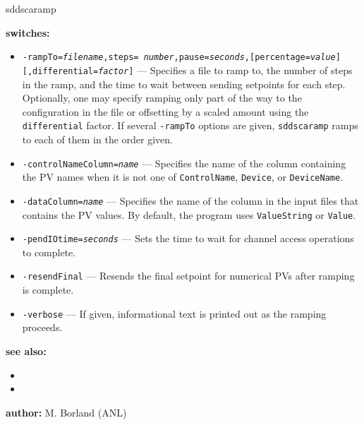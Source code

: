 \begin{sddsprog}{sddscaramp}
\item \textbf{switches:}
    \begin{itemize}
        \item {\tt -rampTo={\em filename},steps={\em
        number},pause={\em seconds},[percentage={\em value}][,differential={\em factor}]} ---
        Specifies a file to ramp to, the number of steps in the ramp,
        and the time to wait between sending setpoints for each step.
        Optionally, one may specify ramping only part of the way to
        the configuration in the file or offsetting by a scaled
        amount using the {\tt differential} factor.  If several
        {\tt -rampTo} options are given, {\tt sddscaramp} ramps to each
        of them in the order given.
        \item {\tt -controlNameColumn={\em name}} --- Specifies the
        name of the column containing the PV names when it is not
        one of {\tt ControlName}, {\tt Device}, or {\tt DeviceName}.
        \item {\tt -dataColumn={\em name}} --- Specifies the name of
        the column in the input files that contains the PV values.
        By default, the program uses {\tt ValueString} or {\tt Value}.
        \item {\tt -pendIOtime={\em seconds}} --- Sets the time to
        wait for channel access operations to complete.
        \item {\tt -resendFinal} --- Resends the final setpoint for
        numerical PVs after ramping is complete.
        \item {\tt -verbose} --- If given, informational text is
        printed out as the ramping proceeds.
      \end{itemize}

\item \textbf{see also:}
    \begin{itemize}
    \item {}
    \item {}
    \end{itemize}
\item \textbf{author:} M. Borland (ANL)
\end{sddsprog}
